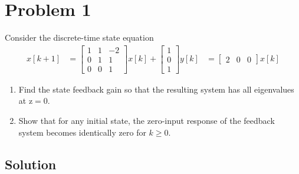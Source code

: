 \section*{Problem 1}

Consider the discrete-time state equation
\begin{align*}
    x[k+1]
     & =
    \begin{bmatrix}
        1 & 1 & -2 \\
        0 & 1 & 1  \\
        0 & 0 & 1
    \end{bmatrix}
    x[k] +
    \begin{bmatrix}
        1 \\
        0 \\
        1
    \end{bmatrix}
    y[k]
     & =
    \begin{bmatrix}
        2 & 0 & 0
    \end{bmatrix}
    x[k]
\end{align*}
\begin{enumerate}[label= (\alph*)]
    \item Find the state feedback gain so that the resulting system has all eigenvalues at \( \mathrm{z}=0 \).
    \item Show that for any initial state, the zero-input response of the feedback system becomes identically zero for \( k \geq 0 \).
\end{enumerate}

\subsection*{Solution}
